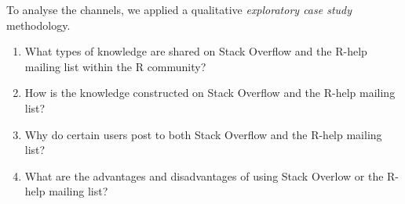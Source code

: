    To analyse the channels, we applied a qualitative \textit{exploratory case study} methodology.


    \begin{enumerate}[label=\bfseries{RQ-\arabic*.},itemsep=3pt, topsep=2pt, leftmargin=3em, parsep=0pt]
        \item What types of knowledge are shared on Stack Overflow and the R-help mailing list within the R community?
        \item How is the knowledge constructed on Stack Overflow and the R-help mailing list? 
        \item Why do certain users post to both Stack Overflow and the R-help mailing list?
        \item What are the advantages and disadvantages of using Stack Overlow or the R-help mailing list?
    \end{enumerate}




